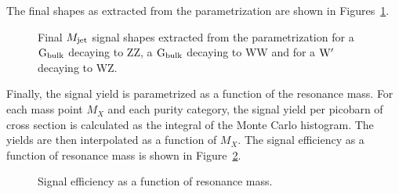 The final \MJO shapes as extracted from the parametrization are shown in Figures~\ref{fig:MJfromjson}.
\begin{figure}[htpb]
\centering
{}
\caption{Final $M_{\rm jet}$ signal shapes extracted from the parametrization for a $\mathrm{G}_\mathrm{bulk}$ decaying to ZZ, a $\mathrm{G}_\mathrm{bulk}$ decaying to WW and for a $\mathrm{W}^\prime$ decaying to WZ.}
\label{fig:MJfromjson}
\end{figure}
Finally, the signal yield is parametrized as a function of the resonance mass. For each mass point $M_X$ and each purity category, the signal yield per picobarn of cross section is calculated as the integral of the Monte Carlo histogram.
The yields are then interpolated as a function of $M_X$. The signal efficiency as a function of resonance mass is shown in Figure~\ref{fig:SignalYields}.
\begin{figure}[htpb]
\centering
{}
\caption{Signal efficiency as a function of resonance mass.}
\label{fig:SignalYields}
\end{figure}



